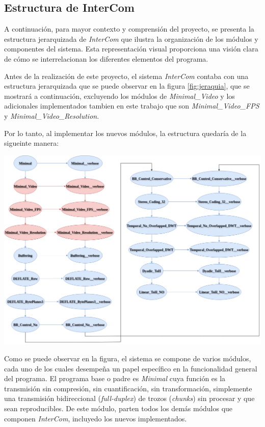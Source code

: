 \subsection{Estructura de InterCom}

A continuación, para mayor contexto y comprensión del proyecto, se presenta la estructura jerarquizada de \textit{InterCom} que ilustra la organización de los módulos y componentes del sistema. Esta representación visual proporciona una visión clara de cómo se interrelacionan los diferentes elementos del programa.
\vspace{\baselineskip}

Antes de la realización de este proyecto, el sistema \textit{InterCom} contaba con una estructura jerarquizada que se puede observar en la figura \ref{fig:jeraquia}, que se mostrará a continuación, excluyendo los módulos de \textit{Minimal\_Video} y los adicionales implementados tambien en este trabajo que son \textit{Minimal\_Video\_FPS} y \textit{Minimal\_Video\_Resolution}. 

\vspace{\baselineskip}
Por lo tanto, al implementar los nuevos módulos, la estructura quedaría de la sigueinte manera:

\begin{center}
	\includegraphics[width = 1.1\textwidth]{images/jerarquia_modulos.png}
	\label{fig:jeraquia}
\end{center}

\vspace{\baselineskip}
Como se puede observar en la figura, el sistema se compone de varios módulos, cada uno de los cuales desempeña un papel específico en la funcionalidad general del programa. El programa base o padre es \textit{Minimal} cuya función es la transmisión sin compresión, sin cuantificación, sin transformación, simplemente una transmisión bidireccional (\textit{full-duplex}) de trozos (\textit{chunks}) sin procesar y que sean reproducibles. De este módulo, parten todos los demás módulos que componen \textit{InterCom}, incluyedo los nuevos implementados. 
\vspace{\baselineskip}

